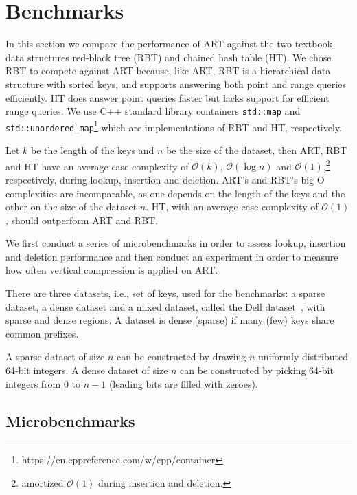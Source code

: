 \documentclass[abstracton,12pt]{scrartcl}
\theoremstyle{definition}
\begin{document}
\newpage

\section{Benchmarks}\label{sec:benchmarks}

In this section we compare the performance of ART against the two textbook
data structures red-black tree (RBT) and chained hash table (HT).
We chose RBT to compete against ART because, like ART, RBT is a hierarchical
data structure with sorted keys, and supports answering both point and range
queries efficiently. HT does answer point queries faster but lacks support for
efficient range queries. We use C++ standard library containers 
\texttt{std::map} and \texttt{std::unordered\_map}\footnote{https://en.cppreference.com/w/cpp/container}
which are implementations of RBT and HT, respectively.

Let $k$ be the length of the keys and $n$ be the size of the dataset, then
ART, RBT and HT have an average case complexity of $\mathcal{O}(k)$, 
$\mathcal{O}(\log{}n)$ and $\mathcal{O}(1)$,\footnote{amortized
$\mathcal{O}(1)$ during insertion and deletion.} respectively, 
during lookup, insertion and deletion. ART's and RBT's big O complexities are
incomparable, as one depends on the length of the keys and the other on the 
size of the dataset $n$. HT, with an average case 
complexity of $\mathcal{O}(1)$, should outperform ART and RBT.

We first conduct a series of microbenchmarks in order to assess lookup,
insertion and deletion performance and then conduct an experiment in order
to measure how often vertical compression is applied on ART. 

There are three datasets, i.e., set of keys, used for the benchmarks: a sparse
dataset, a dense dataset and a mixed dataset, called the Dell
dataset~\cite{wellenzohn2017wapi}, with sparse and dense regions. 
A dataset is dense (sparse) if many (few) keys share common prefixes. 

A sparse dataset of size $n$ can be constructed by drawing $n$ uniformly 
distributed 64-bit integers. A dense dataset of size $n$ can be constructed 
by picking 64-bit integers from $0$ to $n - 1$ (leading bits are filled with 
zeroes).

\subsection{Microbenchmarks}\label{sec:microbenchmarks}
\end{document}
